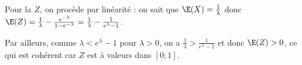 \begin{enumerate}
{		Pour la \va $Z$, on procède par linéarité : 
		on sait que $\E(X)=\frac{1}{\lambda}$ donc $\E(Z) = \frac{1}{\lambda}  -  \frac{e^{-\lambda}}{1-e^{-\lambda}} = \frac{1}{\lambda}  -  \frac{1}{e^{\lambda}-1}$. 
		
		Par ailleurs, comme $\lambda<e^\lambda-1$ pour $\lambda >0$, on a $\frac{1}{\lambda}>\frac{1}{e^\lambda -1}$ et donc $\E(Z)>0$, ce qui est cohérent car $Z$ est à valeurs dans $[0;1]$.}
\end{enumerate}
